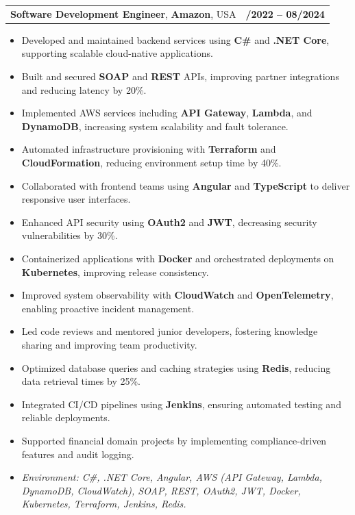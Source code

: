 \documentclass[letterpaper,11pt]{article}
\makeatletter
\newcommand{\resumeItem}[1]{
  \item\footnotesize{
    {#1 \vspace{-2pt}}
  }
}
\newcommand{\resumeSubheading}[4]{
  \vspace{-2pt}\item
    \begin{tabular*}{1.0\textwidth}[t]{l@{\extracolsep{\fill}}r}
      \textbf{\fontsize{10pt}{14pt}\selectfont #3}, \textbf{\fontsize{10pt}{14pt}\selectfont #1}, \fontsize{10pt}{14pt}\selectfont #4 & \textbf{\fontsize{10pt}{14pt}\selectfont #2} \\
    \end{tabular*}\vspace{-7pt}
}
\newcommand{\resumeItemListStart}{\begin{itemize}[leftmargin=*]}
\newcommand{\resumeItemListEnd}{\end{itemize}\vspace{-5pt}}
\makeatother
\begin{document}
\resumeSubheading
{Amazon}{10/2022 -- 08/2024}
{Software Development Engineer}{USA}
\resumeItemListStart
  \resumeItem{Developed and maintained backend services using \textbf{C\#} and \textbf{.NET Core}, supporting scalable cloud-native applications.}
  \resumeItem{Built and secured \textbf{SOAP} and \textbf{REST} APIs, improving partner integrations and reducing latency by 20\%.}
  \resumeItem{Implemented AWS services including \textbf{API Gateway}, \textbf{Lambda}, and \textbf{DynamoDB}, increasing system scalability and fault tolerance.}
  \resumeItem{Automated infrastructure provisioning with \textbf{Terraform} and \textbf{CloudFormation}, reducing environment setup time by 40\%.}
  \resumeItem{Collaborated with frontend teams using \textbf{Angular} and \textbf{TypeScript} to deliver responsive user interfaces.}
  \resumeItem{Enhanced API security using \textbf{OAuth2} and \textbf{JWT}, decreasing security vulnerabilities by 30\%.}
  \resumeItem{Containerized applications with \textbf{Docker} and orchestrated deployments on \textbf{Kubernetes}, improving release consistency.}
  \resumeItem{Improved system observability with \textbf{CloudWatch} and \textbf{OpenTelemetry}, enabling proactive incident management.}
  \resumeItem{Led code reviews and mentored junior developers, fostering knowledge sharing and improving team productivity.}
  \resumeItem{Optimized database queries and caching strategies using \textbf{Redis}, reducing data retrieval times by 25\%.}
  \resumeItem{Integrated CI/CD pipelines using \textbf{Jenkins}, ensuring automated testing and reliable deployments.}
  \resumeItem{Supported financial domain projects by implementing compliance-driven features and audit logging.}
  \resumeItem{\textit{Environment: C\#, .NET Core, Angular, AWS (API Gateway, Lambda, DynamoDB, CloudWatch), SOAP, REST, OAuth2, JWT, Docker, Kubernetes, Terraform, Jenkins, Redis.}}
\resumeItemListEnd
\end{document}

